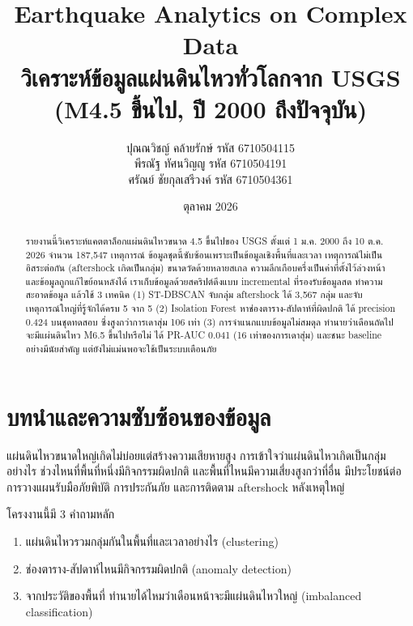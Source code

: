 \documentclass[11pt,a4paper]{article}
\title{\textbf{Earthquake Analytics on Complex Data}\\[4pt]
\large วิเคราะห์ข้อมูลแผ่นดินไหวทั่วโลกจาก USGS (M4.5 ขึ้นไป, ปี 2000 ถึงปัจจุบัน)}
\author{%
ปุณณวิชญ์ คล้ายรักษ์ \quad รหัส 6710504115\\[30pt]
พีรณัฐ ทัศนวิญญู \quad รหัส 6710504191\\[30pt]
ศรัณย์ ชัยกุลเสรีวงค์ \quad รหัส 6710504361}
\date{ตุลาคม 2026}
\begin{document}
{\setlength{\lineskiplimit}{0pt}\maketitle}
\vspace{1.5cm}

\begin{abstract}
\noindent
รายงานนี้วิเคราะห์แคตตาล็อกแผ่นดินไหวขนาด 4.5 ขึ้นไปของ USGS ตั้งแต่ 1 ม.ค. 2000 ถึง 10 ต.ค. 2026
จำนวน 187{,}547 เหตุการณ์ ข้อมูลชุดนี้ซับซ้อนเพราะเป็นข้อมูลเชิงพื้นที่และเวลา เหตุการณ์ไม่เป็นอิสระต่อกัน
(aftershock เกิดเป็นกลุ่ม) ขนาดวัดด้วยหลายสเกล ความลึกเกือบครึ่งเป็นค่าที่ตั้งไว้ล่วงหน้า และข้อมูลถูกแก้ไขย้อนหลังได้
เราเก็บข้อมูลด้วยสคริปต์ดึงแบบ incremental ที่รองรับข้อมูลสด ทำความสะอาดข้อมูล แล้วใช้ 3 เทคนิค
(1) ST-DBSCAN จับกลุ่ม aftershock ได้ 3{,}567 กลุ่ม และจับเหตุการณ์ใหญ่ที่รู้จักได้ครบ 5 จาก 5
(2) Isolation Forest หาช่องตาราง-สัปดาห์ที่ผิดปกติ ได้ precision 0.424 บนชุดทดสอบ ซึ่งสูงกว่าการเดาสุ่ม 106 เท่า
(3) การจำแนกแบบข้อมูลไม่สมดุล ทำนายว่าเดือนถัดไปจะมีแผ่นดินไหว M6.5 ขึ้นไปหรือไม่ ได้ PR-AUC 0.041
(16 เท่าของการเดาสุ่ม) และชนะ baseline อย่างมีนัยสำคัญ แต่ยังไม่แม่นพอจะใช้เป็นระบบเตือนภัย
\end{abstract}

\newpage

\tableofcontents
\newpage

\section{บทนำและความซับซ้อนของข้อมูล}

แผ่นดินไหวขนาดใหญ่เกิดไม่บ่อยแต่สร้างความเสียหายสูง การเข้าใจว่าแผ่นดินไหวเกิดเป็นกลุ่มอย่างไร
ช่วงไหนที่พื้นที่หนึ่งมีกิจกรรมผิดปกติ และพื้นที่ไหนมีความเสี่ยงสูงกว่าที่อื่น
มีประโยชน์ต่อการวางแผนรับมือภัยพิบัติ การประกันภัย และการติดตาม aftershock หลังเหตุใหญ่

โครงงานนี้มี 3 คำถามหลัก
\begin{enumerate}
  \item แผ่นดินไหวรวมกลุ่มกันในพื้นที่และเวลาอย่างไร (clustering)
  \item ช่องตาราง-สัปดาห์ไหนมีกิจกรรมผิดปกติ (anomaly detection)
  \item จากประวัติของพื้นที่ ทำนายได้ไหมว่าเดือนหน้าจะมีแผ่นดินไหวใหญ่ (imbalanced classification)
\end{enumerate}
\end{document}
